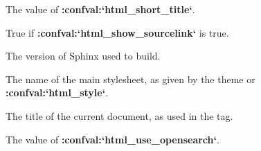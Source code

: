 \documentclass[letterpaper,10pt,english]{sphinxmanual}
\begin{document}

\begin{fulllineitems}
\label{templating:shorttitle}
The value of {\color{red}\bfseries{}:confval:{}`html\_short\_title{}`}.

\end{fulllineitems}


\begin{fulllineitems}
\label{templating:show_source}
True if {\color{red}\bfseries{}:confval:{}`html\_show\_sourcelink{}`} is true.

\end{fulllineitems}


\begin{fulllineitems}
\label{templating:sphinx_version}
The version of Sphinx used to build.

\end{fulllineitems}


\begin{fulllineitems}
\label{templating:style}
The name of the main stylesheet, as given by the theme or
{\color{red}\bfseries{}:confval:{}`html\_style{}`}.

\end{fulllineitems}


\begin{fulllineitems}
\label{templating:title}
The title of the current document, as used in the  tag.

\end{fulllineitems}


\begin{fulllineitems}
\label{templating:use_opensearch}
The value of {\color{red}\bfseries{}:confval:{}`html\_use\_opensearch{}`}.

\end{fulllineitems}

\end{document}
